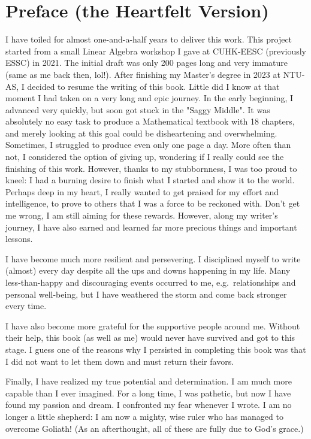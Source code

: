 \chapter*{Preface (the Heartfelt Version)}
I have toiled for almost one-and-a-half years to deliver this work. This project started from a small Linear Algebra workshop I gave at CUHK-EESC (previously ESSC) in 2021. The initial draft was only 200 pages long and very immature (same as me back then, lol!). After finishing my Master's degree in 2023 at NTU-AS, I decided to resume the writing of this book. Little did I know at that moment I had taken on a very long and epic journey. In the early beginning, I advanced very quickly, but soon got stuck in the "Saggy Middle". It was absolutely no easy task to produce a Mathematical textbook with 18 chapters, and merely looking at this goal could be disheartening and overwhelming. Sometimes, I struggled to produce even only one page a day. More often than not, I considered the option of giving up, wondering if I really could see the finishing of this work. However, thanks to my stubbornness, I was too proud to kneel: I had a burning desire to finish what I started and show it to the world. Perhaps deep in my heart, I really wanted to get praised for my effort and intelligence, to prove to others that I was a force to be reckoned with. Don't get me wrong, I am still aiming for these rewards. However, along my writer's journey, I have also earned and learned far more precious things and important lessons.

I have become much more resilient and persevering. I disciplined myself to write (almost) every day despite all the ups and downs happening in my life. Many less-than-happy and discouraging events occurred to me, e.g.\ relationships and personal well-being, but I have weathered the storm and come back stronger every time.

I have also become more grateful for the supportive people around me. Without their help, this book (as well as me) would never have survived and got to this stage. I guess one of the reasons why I persisted in completing this book was that I did not want to let them down and must return their favors.

Finally, I have realized my true potential and determination. I am much more capable than I ever imagined. For a long time, I was pathetic, but now I have found my passion and dream. I confronted my fear whenever I wrote. I am no longer a little shepherd: I am now a mighty, wise ruler who has managed to overcome Goliath! (As an afterthought, all of these are fully due to God's grace.)

